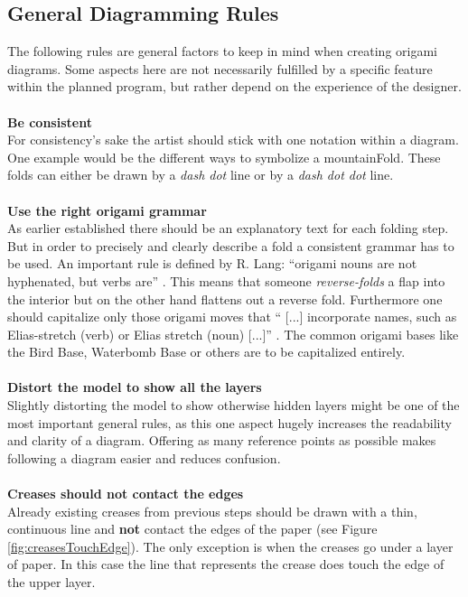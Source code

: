 \newpage
\subsection{General Diagramming Rules}
\label{sec:generalRules}
The following rules are general factors to keep in mind when creating origami diagrams. Some aspects here are not necessarily fulfilled by a specific feature within the planned program, but rather depend on the experience of the designer.\\
\\
\textbf{Be consistent}\\
For consistency's sake the artist should stick with one notation within a diagram. One example would be the different ways to symbolize a \gls{mountainFold}. These folds can either be drawn by a \emph{dash dot} line or by a \emph{dash dot dot} line.\\
\\
\textbf{Use the right origami grammar}\\
As earlier established there should be an explanatory text for each folding step. But in order to precisely and clearly describe a fold a consistent grammar has to be used. An important rule is defined by R. Lang: \enquote{origami nouns are not hyphenated, but verbs are} \cite{Lang}. This means that someone \emph{reverse-folds} a flap into the interior but on the other hand flattens out a reverse fold.
Furthermore one should capitalize only those origami moves that \enquote{ [...] incorporate names, such as Elias-stretch (verb) or Elias stretch (noun) [...]} \cite{Lang}. The common origami bases like the Bird Base, Waterbomb Base or others are to be capitalized entirely.\\
\\
\textbf{Distort the model to show all the layers}\\
Slightly distorting the model to show otherwise hidden layers might be one of the most important general rules, as this one aspect hugely increases the readability and clarity of a diagram. Offering as many reference points as possible makes following a diagram easier and reduces confusion.\\
\\
\textbf{Creases should not contact the edges}\\
Already existing creases from previous steps should be drawn with a thin, continuous line and \textbf{not} contact the edges of the paper (see Figure \ref{fig:creasesTouchEdge}). The only exception is when the creases go under a layer of paper. In this case the line that represents the crease does touch the edge of the upper layer.\\

